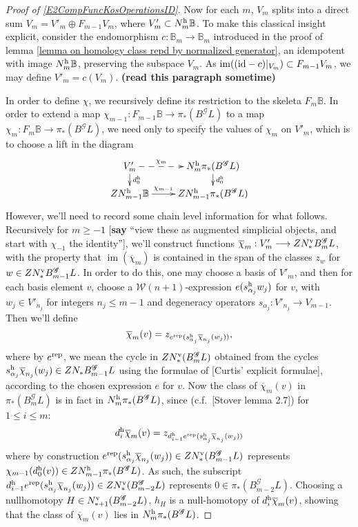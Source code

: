 \documentclass[11pt]{amsart}
\theoremstyle{plain}
\theoremstyle{definition}
\DeclareMathOperator{\im}{im}
\renewcommand{\to}{\longrightarrow}
\newcommand{\scrG}{\mathscr{G}}
\newcommand{\calW}{\mathcal{W}}
\theoremstyle{plain}
\newcommand{\BSW}{{\scrG}}
\newcommand{\BSWres}{B^\BSW}%
\newcommand{\Id}{\textup{id}}
\begin{document}
\begin{Operations in composite functor spectral sequences}
\begin{proof}[Proof of \ref{E2CompFuncKosOperationsID}]
Now for each $m$, $V_m$ splits into a direct sum
$V_m=V'_m\oplus F_{m-1}V_m$,
where $V'_m\subset N_m^\textup{h}\mathbb{B}$. To make this classical insight explicit, consider the endomorphism $c:\mathbb{B}_m\to \mathbb{B}_m$ introduced in the proof of lemma \ref{lemma on homology class repd by normalized generator}, an idempotent with image $N_m^\textup{h}\mathbb{B}$, preserving the subspace $V_m$. As $\im((\Id-c)|_{V_m})\subset F_{m-1}V_m$, we may define $V'_m=c(V_m)$. \textbf{(read this paragraph sometime)}

In order to define $\chi$, we recursively define its restriction to the skeleta $F_m\mathbb{B}$. In order to extend a map $\chi_{m-1}:F_{m-1}\mathbb{B}\to \pi_*(\BSWres L)$ to a map $\chi_m:F_m\mathbb{B}\to \pi_*(\BSWres L)$, we need only to specify the values of $\chi_m$ on $V'_m$, which is to choose a lift in the diagram
\[\xymatrix@R=4mm{
V'_m\ar@{-->}[r]^-{\chi_m}
\ar[d]^-{d_0^\textup{h}}
&%
N^\textup{h}_m\pi_*(\BSWres L)\ar[d]^-{d_0^\textup{h}}
\\%
ZN^\textup{h}_{m-1}\mathbb{B}\ar[r]^-{\chi_{m-1}}
&%
ZN^\textup{h}_{m-1}\pi_*(\BSWres L)%
}\]
However, we'll need to record some chain level information for what follows. Recursively for $m\geq-1$ [\textbf{say} ``view these as augmented simplicial objects, and start with $\chi_{-1}$ the identity''], we'll construct functions $\overline{\chi}_m:V'_m\to ZN^\textup{v}_*\BSWres_m L$, with the property that $\im(\overline{\chi}_m)$ is contained in the span of the classes $z_{w}$ for $w\in ZN^\textup{v}_*\BSWres_{m-1}L$. In order to do this, one may choose a basis of $V'_m$, and then for each basis element $v$, choose a $\calW(n+1)$-expression $e(s^\textup{h}_{\alpha_j}w_j)$ for $v$, with $w_j\in V'_{n_j}$ for integers $n_j\leq m-1$ and degeneracy operators $s_{\alpha_j}:V'_{n_j}\to V_{m-1}$. Then we'll define
\[\overline{\chi}_m(v)=z_{e^\textup{rep}(s^\textup{h}_{\alpha_j}\overline{\chi}_{n_j}(w_j))},\]
where by $e^\textup{rep}$, we mean the cycle in $ZN_*^\textup{v}(\BSWres_mL)$ obtained from the cycles $s^\textup{h}_{\alpha_j}\overline{\chi}_{n_j}(w_j)\in ZN_*\BSWres_{m-1}L$ using the formulae of [Curtis' explicit formulae], according to the chosen expression $e$ for $v$.
Now the class of $\overline{\chi}_m(v)$ in $\pi_*(\BSWres_mL)$ is in fact in $N^\textup{h}_m\pi_*(\BSWres L)$, since (c.f.\ [Stover lemma 2.7]) for $1\leq i \leq m$:
\[d_i^\textup{h}\overline{\chi}_m(v) =z_{d^\textup{h}_{i-1}e^\textup{rep}(s^\textup{h}_{\alpha_j}\overline{\chi}_{n_j}(w_j))}\]
where by construction $e^\textup{rep}(s^\textup{h}_{\alpha_j}\overline{\chi}_{n_j}(w_j))\in ZN^\textup{v}_*(\BSWres_{m-1} L)$ represents $\chi_{m-1}(d_{0}^\textup{h}(v))\in ZN_{m-1}^\textup{h}\pi_*(\BSWres  L)$. As such, the subscript $d^\textup{h}_{i-1}e^\textup{rep}(s^\textup{h}_{\alpha_j}\overline{\chi}_{n_j}(w_j))\in ZN^\textup{v}_*(\BSWres_{m-2} L)$ represents $0\in\pi_*(\BSWres_{m-2}L)$. Choosing a nullhomotopy $H\in N^\textup{v}_{*+1}(\BSWres_{m-2}L)$, $h_H$ is a null-homotopy of $d_i^\textup{h}\overline{\chi}_m(v)$, showing that the class of  $\overline{\chi}_m(v)$ lies in $N^\textup{h}_m\pi_*(\BSWres L)$.

\end{proof}
\end{Operations in composite functor spectral sequences}
\end{document}
